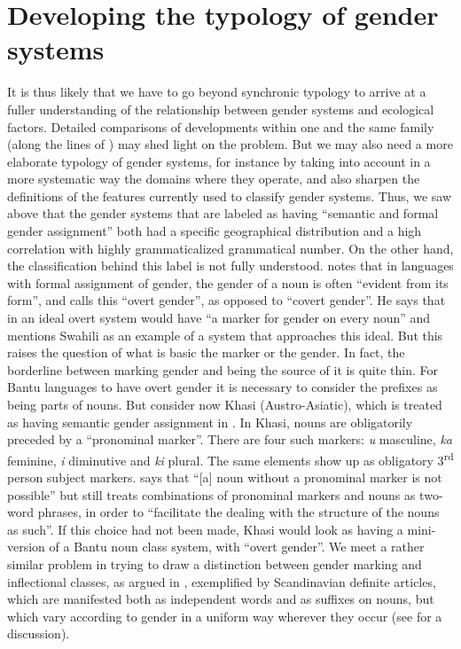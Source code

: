 \documentclass[output=collectionpaper]{langsci/langscibook}
\begin{document}
\section{Developing the typology of gender systems}

It is thus likely that we have to go beyond synchronic typology to arrive at a fuller understanding of the relationship between gender systems and ecological factors. Detailed comparisons of developments within one and the same family (along the lines of ) may shed light on the problem. But we may also need a more elaborate typology of gender systems, for instance by taking into account in a more systematic way the domains where they operate, and also sharpen the definitions of the features currently used to classify gender systems. Thus, we saw above that the gender systems that are labeled as having ``semantic and formal gender assignment'' both had a specific geographical distribution and a high correlation with highly grammaticalized grammatical number. On the other hand, the classification behind this label is not fully understood. \citet[62]{Corbett1991} notes that in languages with formal assignment of gender, the gender of a noun is often ``evident from its form'', and calls this ``overt gender'', as opposed to ``covert gender''. He says that in an ideal overt system would have ``a marker for gender on every noun'' and mentions Swahili as an example of a system that approaches this ideal. But this raises the question of what is basic \textendash{} the marker or the gender. In fact, the borderline between marking gender and being the source of it is quite thin. For Bantu languages to have overt gender it is necessary to consider the prefixes as being parts of nouns. But consider now Khasi (Austro-Asiatic), which is treated as having semantic gender assignment in \citet{Corbett2013b}.  In Khasi, nouns are obligatorily preceded by a ``pronominal marker''. There are four such markers: \textit{u} masculine, \textit{ka} feminine, \textit{i} diminutive and \textit{ki} plural. The same elements show up as obligatory 3\textsuperscript{rd} person subject markers. \citet[7]{Nagaraj1985} says that ``[a] noun without a pronominal marker is not possible'' but still treats combinations of pronominal markers and nouns as two-word phrases, in order to ``facilitate the dealing with the structure of the nouns as such''. If this choice had not been made, Khasi would look as having a mini-version of a Bantu noun class system, with ``overt gender''. We meet a rather similar problem in trying to draw a distinction between gender marking and inflectional classes, as argued in \citet{Dahl2000}, exemplified by Scandinavian definite articles, which are manifested both as independent words and as suffixes on nouns, but which vary according to gender in a uniform way wherever they occur (see \citealt{Dahl2000} for a discussion).
\end{document}
